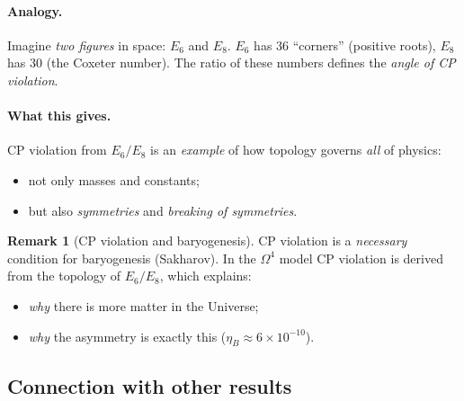 \documentclass[11pt,a4paper]{article}
\newcommand{\Om}{\Omega^4}
\theoremstyle{definition}
\newtheorem{remark}[theorem]{Remark}
\begin{document}
\paragraph{Analogy.}
Imagine \emph{two figures} in space: $E_6$ and $E_8$. 
$E_6$ has $36$ ``corners'' (positive roots), $E_8$ has $30$ 
(the Coxeter number). The ratio of these numbers defines 
the \emph{angle of CP violation}.

\paragraph{What this gives.}
CP violation from $E_6/E_8$ is an \emph{example} of how topology 
governs \emph{all} of physics:
\begin{itemize}
    \item not only masses and constants;
    \item but also \emph{symmetries} and \emph{breaking of symmetries}.
\end{itemize}

\begin{remark}[CP violation and baryogenesis]
\label{rem:cp-baryogenesis}
CP violation is a \emph{necessary} condition for baryogenesis 
(Sakharov). In the $\Om$ model CP violation is derived from the 
topology of $E_6/E_8$, which explains:
\begin{itemize}
    \item \emph{why} there is more matter in the Universe;
    \item \emph{why} the asymmetry is exactly this 
          ($\eta_B \approx 6 \times 10^{-10}$).
\end{itemize}
\end{remark}

\subsection{Connection with other results}
\label{subsec:cp-links}
\end{document}
